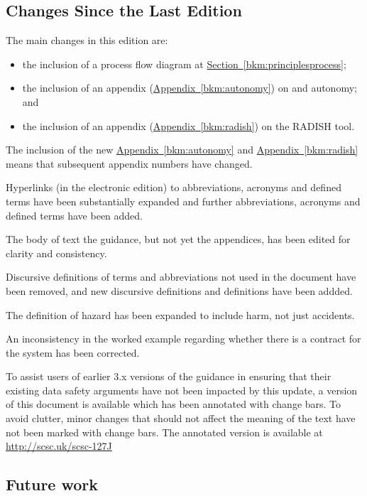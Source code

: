\subsection*{Changes Since the Last Edition}%
The main changes in this edition are:
\begin{itemize}
\item the inclusion of a process flow diagram at \hyperref[bkm:principlesprocess]{{Section}~\ref{bkm:principlesprocess}};
\item the inclusion of an appendix (\hyperref[bkm:autonomy]{{Appendix}~\ref{bkm:autonomy}}) on  and autonomy; and
\item the inclusion of an appendix (\hyperref[bkm:radish]{{Appendix}~\ref{bkm:radish}}) on the RADISH tool.
\end{itemize}
The inclusion of the new \hyperref[bkm:autonomy]{{Appendix}~\ref{bkm:autonomy}} and \hyperref[bkm:radish]{{Appendix}~\ref{bkm:radish}} means that subsequent appendix numbers have changed.

Hyperlinks (in the electronic edition) to abbreviations, acronyms and defined terms have been substantially expanded and further abbreviations, acronyms and defined terms have been added.

The body of text the guidance, but not yet the appendices, has been edited for clarity and consistency.

Discursive definitions of terms and abbreviations not used in the document have been removed, and new discursive definitions and definitions have been addded.

The definition of hazard has been expanded to include harm, not just accidents.

An inconsistency in the worked example regarding whether there is a contract for the system has been corrected.

To assist users of earlier 3.x versions of the guidance in ensuring that their existing data safety arguments have not been impacted by this update, a version of this document is available which has been annotated with change bars. To avoid clutter, minor changes that should not affect the meaning of the text have not been marked with change bars. The annotated version is available at \href{http://scsc.uk/scsc-127J}{http://scsc.uk/scsc-127J}

\subsection*{Future work}

